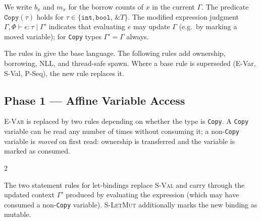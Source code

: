 \noindent
We write $b_x$ and $m_x$ for the borrow counts of $x$ in the current $\Gamma$.
The predicate $\mathtt{Copy}(\tau)$ holds for $\tau \in \{\mathtt{int},\mathtt{bool},\,\&T\}$.
The modified expression judgment $\Gamma,\Phi \vdash e : \tau \mid \Gamma'$
indicates that evaluating $e$ may update $\Gamma$ (e.g.\ by marking a moved
variable); for \texttt{Copy} types $\Gamma' = \Gamma$ always.

The rules in  give the base language.
The following rules add ownership, borrowing, NLL, and thread-safe spawn.
Where a base rule is superseded (E-Var, S-Val, P-Seq), the new rule replaces it.

\subsection*{Phase 1 --- Affine Variable Access}

\textsc{E-Var} is replaced by two rules depending on whether the type is
\texttt{Copy}.
A \texttt{Copy} variable can be read any number of times without consuming it;
a non-\texttt{Copy} variable is \emph{moved} on first read: ownership is
transferred and the variable is marked as consumed.

\vspace{0.5em}
\begin{multicols}{2}

    \begin{prooftree}
    \end{prooftree}

    \columnbreak

    \begin{prooftree}
    \end{prooftree}

\end{multicols}

The two statement rules for let-bindings replace \textsc{S-Val} and carry
through the updated context $\Gamma'$ produced by evaluating the expression
(which may have consumed a non-\texttt{Copy} variable).
\textsc{S-LetMut} additionally marks the new binding as mutable.

